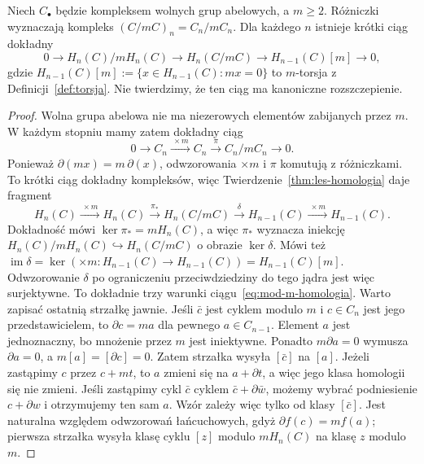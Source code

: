 \begin{twierdzenie}
\label{thm:mod-m-homologia}
Niech $C_\bullet$ będzie kompleksem
wolnych grup abelowych, a $m\geq2$.
Różniczki wyznaczają kompleks
$(C/mC)_n=C_n/mC_n$. Dla każdego
$n$ istnieje krótki ciąg dokładny
\begin{equation}\label{eq:mod-m-homologia}
 0\longrightarrow H_n(C)/mH_n(C)
 \longrightarrow H_n(C/mC)
 \longrightarrow H_{n-1}(C)[m]
 \longrightarrow0,
\end{equation}
gdzie $H_{n-1}(C)[m]:=
\{x\in H_{n-1}(C):mx=0\}$
to $m$-torsja z Definicji~\ref{def:torsja}.
Nie twierdzimy, że ten ciąg ma
kanoniczne rozszczepienie.
\end{twierdzenie}
\begin{proof}
Wolna grupa abelowa nie ma
niezerowych elementów zabijanych
przez $m$. W każdym stopniu mamy
zatem dokładny ciąg
\[
 0\to C_n\xrightarrow{\ \times m\ }C_n
 \xrightarrow{\ \pi\ }C_n/mC_n\to0.
\]
Ponieważ $\partial(mx)=m\,\partial(x)$,
odwzorowania $\times m$ i $\pi$
komutują z różniczkami.
To krótki ciąg dokładny
kompleksów, więc
Twierdzenie~\ref{thm:les-homologia}
daje fragment
\[
 H_n(C)\xrightarrow{\ \times m\ }H_n(C)
 \xrightarrow{\ \pi_*\ }H_n(C/mC)
 \xrightarrow{\ \delta\ }H_{n-1}(C)
 \xrightarrow{\ \times m\ }H_{n-1}(C).
\]
Dokładność mówi
$\ker\pi_*=mH_n(C)$, a więc
$\pi_*$ wyznacza iniekcję
$H_n(C)/mH_n(C)\hookrightarrow H_n(C/mC)$
o obrazie $\ker\delta$.
Mówi też
$\operatorname{im}\delta
=\ker(\times m:H_{n-1}(C)\to H_{n-1}(C))
=H_{n-1}(C)[m]$.
Odwzorowanie $\delta$ po ograniczeniu
przeciwdziedziny do tego jądra
jest więc surjektywne.
To dokładnie trzy warunki
ciągu~\eqref{eq:mod-m-homologia}.
Warto zapisać ostatnią strzałkę jawnie. Jeśli $\bar c$ jest cyklem
modulo $m$ i $c\in C_n$ jest jego przedstawicielem, to
$\partial c=ma$ dla pewnego $a\in C_{n-1}$.
Element $a$ jest jednoznaczny, bo mnożenie przez $m$ jest iniektywne.
Ponadto $m\partial a=0$ wymusza $\partial a=0$,
a $m[a]=[\partial c]=0$. Zatem strzałka wysyła $[\bar c]$ na $[a]$.
Jeżeli zastąpimy $c$ przez $c+mt$, to $a$ zmieni się
na $a+\partial t$, a więc jego klasa homologii się nie zmieni.
Jeśli zastąpimy cykl $\bar c$ cyklem
$\bar c+\partial\bar w$, możemy wybrać podniesienie
$c+\partial w$ i otrzymujemy ten sam $a$.
Wzór zależy więc tylko od klasy $[\bar c]$.
Jest naturalna względem odwzorowań łańcuchowych, gdyż
$\partial f(c)=mf(a)$; pierwsza strzałka wysyła klasę cyklu
$[z]$ modulo $mH_n(C)$ na klasę $z$ modulo $m$.
\end{proof}

